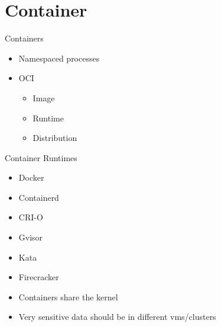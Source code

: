 \documentclass{dcpresentation}
\begin{document}
\section{Container}

\begin{frame}
\end{frame}

\begin{frame}
\end{frame}

\begin{frame}{Containers}
  \begin{itemize}
  \item Namespaced processes
  \item OCI
    \begin{itemize}
    \item Image
    \item Runtime
    \item Distribution
    \end{itemize}
  \end{itemize}
\end{frame}



\begin{frame}{Container Runtimes}
  \begin{itemize}
  \item Docker
  \item Containerd
  \item CRI-O
  \item Gvisor
  \item Kata
  \item Firecracker
  \end{itemize}
\end{frame}

\begin{frame}
  \begin{itemize}
  \item Containers share the kernel
  \item \alert<2>{Very sensitive data should be in different vms/clusters}
  \end{itemize}
\end{frame}
\end{document}
